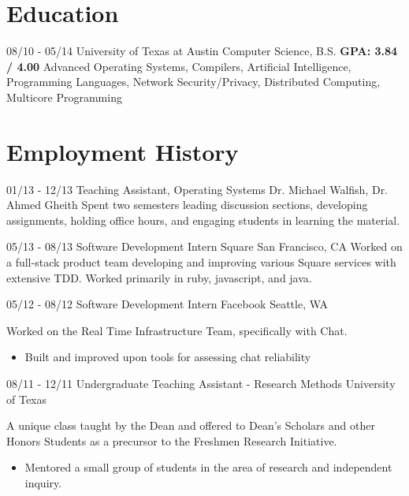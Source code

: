 \documentclass[11pt,letter,sans]{moderncv}
\begin{document}
\maketitle

\section{Education}
\cventry
{08/10 - 05/14}
{University of Texas at Austin}
{Computer Science, B.S. \textbf{GPA: 3.84 / 4.00}}
{}
{}
{}
{Advanced Operating Systems, Compilers, Artificial Intelligence, Programming
Languages, Network Security/Privacy, Distributed Computing, Multicore
Programming}

\section{Employment History}
\cventry
{01/13 - 12/13}
{Teaching Assistant, Operating Systems}
{Dr. Michael Walfish, Dr. Ahmed Gheith}
{}
{}
{Spent two semesters leading discussion sections, developing assignments, holding office hours, and engaging students in learning the material.}

\cventry
{05/13 - 08/13}
{Software Development Intern}
{Square}
{San Francisco, CA}
{}
{Worked on a full-stack product team developing and improving various Square
services with extensive TDD. Worked primarily in ruby, javascript, and java.}

\cventry
{05/12 - 08/12}
{Software Development Intern}
{Facebook}
{Seattle, WA}
{}
{Worked on the Real Time Infrastructure Team, specifically with Chat.
  \begin{itemize}
    \item Built and improved upon tools for assessing chat reliability
\end{itemize}}


\cventry
{08/11 - 12/11}
{Undergraduate Teaching Assistant - Research Methods}
{University of Texas}
{}
{}
{A unique class taught by the Dean and offered to Dean's Scholars and other
  Honors Students as a precursor to the Freshmen Research Initiative.
  \begin{itemize}
    \item Mentored a small group of students in the area of research and
      independent inquiry.
\end{itemize}}
\end{document}
